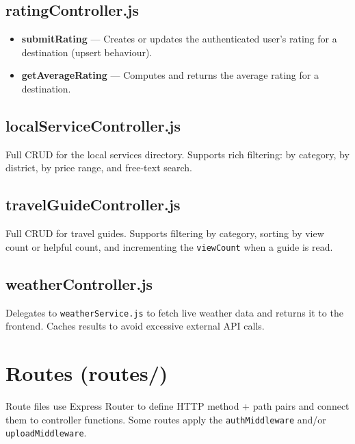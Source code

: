 \documentclass[12pt,a4paper]{report}
\begin{document}
\subsection{ratingController.js}

\begin{itemize}[leftmargin=2em]
  \item \textbf{submitRating} — Creates or updates the authenticated user's rating for a destination (upsert behaviour).
  \item \textbf{getAverageRating} — Computes and returns the average rating for a destination.
\end{itemize}

\subsection{localServiceController.js}

Full CRUD for the local services directory. Supports rich filtering: by category, by district, by price range, and free-text search.

\subsection{travelGuideController.js}

Full CRUD for travel guides. Supports filtering by category, sorting by view count or helpful count, and incrementing the \texttt{viewCount} when a guide is read.

\subsection{weatherController.js}

Delegates to \texttt{weatherService.js} to fetch live weather data and returns it to the frontend. Caches results to avoid excessive external API calls.

\section{Routes (routes/)}

Route files use Express Router to define HTTP method + path pairs and connect them to controller functions. Some routes apply the \texttt{authMiddleware} and/or \texttt{uploadMiddleware}.
\end{document}
